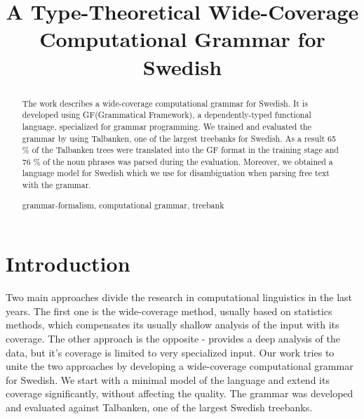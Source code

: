 \documentclass[runningheads,a4paper]{llncs}
\newcommand{\keywords}[1]{\par\addvspace\baselineskip
\noindent\keywordname\enspace\ignorespaces#1}
\begin{document}
\mainmatter  %

\title{A Type-Theoretical Wide-Coverage Computational Grammar for Swedish}

\author{}
\institute{}


\maketitle


\begin{abstract}
The work describes a wide-coverage computational grammar for Swedish. 
It is developed using GF(Grammatical Framework), a dependently-typed 
functional language, specialized for grammar programming. We trained
and evaluated the grammar by using Talbanken, one of the largest treebanks for 
Swedish. As a result 65 $\%$ of the Talbanken trees were translated
into the GF format in the training stage and 76 \% of the noun phrases
was parsed during the evaluation. Moreover, we obtained a language
model for Swedish which we use for disambiguation when parsing free text
with the grammar. 
\keywords{grammar-formalism, computational grammar, treebank}
\end{abstract}


\section{Introduction}




Two main approaches divide the research in computational linguistics
in the last years. The first one is the wide-coverage method, usually based on
statistics methods, which compensates its usually shallow analysis of the
input with its coverage. The other approach is the opposite - provides
a deep analysis of the data, but it's coverage is limited to
very specialized input. Our work tries to unite the two approaches by
developing a wide-coverage computational grammar for Swedish. We start
with a minimal model of the language and extend its coverage
significantly, without affecting the quality. The grammar was
developed and evaluated against Talbanken\cite{talbanken}, one of the
largest Swedish treebanks. 
\end{document}
